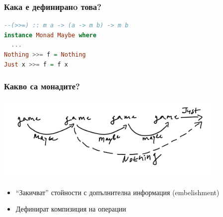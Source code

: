 \documentclass{beamer}
\begin{document}
\begin{frame}[fragile]
  \frametitle{Кака е дефиниранo това?}

\begin{lstlisting}[basicstyle=\small,language=Haskell]
--(>>=) :: m a -> (a -> m b) -> m b
instance Monad Maybe where
  ...
Nothing >>= f = Nothing
Just x >>= f = f x
\end{lstlisting}

\end{frame}


\begin{frame}[fragile]
  \frametitle{Какво са монадите?}

  \includegraphics[width=110mm]{images/composition}

\begin{itemize}
  \item ``Закичват'' стойности с допълнителна информация (embelishment)
  \item Дефинират компизиция на операции
\end{itemize}

\end{frame}
 
\end{document}
